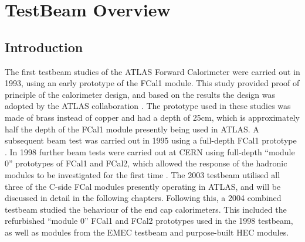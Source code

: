 





%
%
%
% 







\chapter{TestBeam Overview}
\label{chap_TB_intro}
\section{Introduction}






The first testbeam studies of the ATLAS Forward Calorimeter were carried out in 1993, using an early prototype of the FCal1 module\cite{TB93_prototype}. This study provided proof of principle of the calorimeter design, and based on the results the design was adopted by the ATLAS collaboration \cite{TB93_prototype}. The prototype used in these studies was made of brass instead of copper and had a depth of 25cm, which is approximately half the depth of the FCal1 module presently being used in ATLAS. A subsequent beam test was carried out in 1995 using a full-depth FCal1 prototype \cite{TB95_prototype}. In 1998 further beam tests were carried out at CERN using full-depth ``module 0'' prototypes of FCal1 and FCal2, which allowed the response of the hadronic modules to be investigated for the first time \cite{TB98_testbeam_results,TB98_electron_signals}. The 2003 testbeam utilised all three of the C-side FCal modules presently operating in ATLAS, and will be discussed in detail in the following chapters. Following this, a 2004 combined testbeam studied the behaviour of the end cap calorimeters\cite{TB2004pub}. This included the refurbished ``module 0'' FCal1 and FCal2 prototypes used in the 1998 testbeam, as well as modules from the EMEC testbeam and purpose-built HEC modules.
%
%

